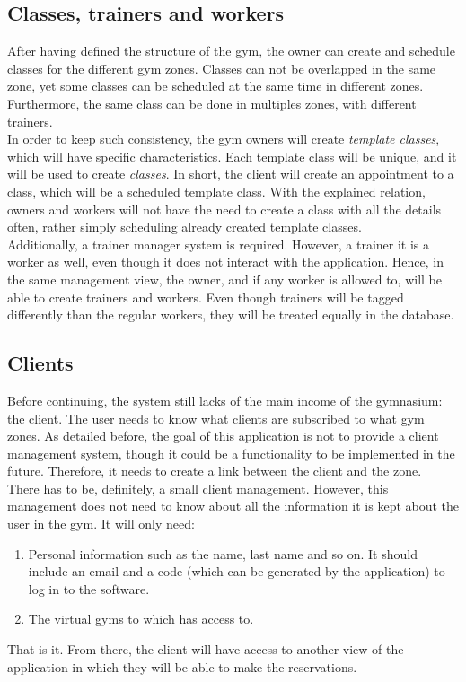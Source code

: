 \documentclass[a4paper,12pt]{book}
\begin{document}
\subsection{Classes, trainers and workers}
After having defined the structure of the gym, the owner can create and schedule classes for the different gym zones. Classes can not be overlapped in the same zone, yet some classes can be scheduled at the same time in different zones. Furthermore, the same class can be done in multiples zones, with different trainers. 
\\[8pt]
In order to keep such consistency, the gym owners will create \emph{template classes}, which will have specific characteristics. Each template class will be unique, and it will be used to create \emph{classes}. In short, the client will create an appointment to a class, which will be a scheduled template class. With the explained relation, owners and workers will not have the need to create a class with all the details often, rather simply scheduling already created template classes.
\\[8pt]
Additionally, a trainer manager system is required. However, a trainer it is a worker as well, even though it does not interact with the application. Hence, in the same management view, the owner, and if any worker is allowed to, will be able to create trainers and workers. Even though trainers will be tagged differently than the regular workers, they will be treated equally in the database.
\subsection{Clients}
Before continuing, the system still lacks of the main income of the gymnasium: the client. The user needs to know what clients are subscribed to what gym zones. As detailed before, the goal of this application is not to provide a client management system, though it could be a functionality to be implemented in the future. Therefore, it needs to create a link between the client and the zone.
\\[8pt]
There has to be, definitely, a small client management. However, this management does not need to know about all the information it is kept about the user in the gym. It will only need:
\begin{enumerate}[label = -]
	\item Personal information such as the name, last name and so on. It should include an email and a code (which can be generated by the application) to log in to the software.
	\item The virtual gyms to which has access to.
\end{enumerate}
That is it. From there, the client will have access to another view of the application in which they will be able to make the reservations.
\end{document}

